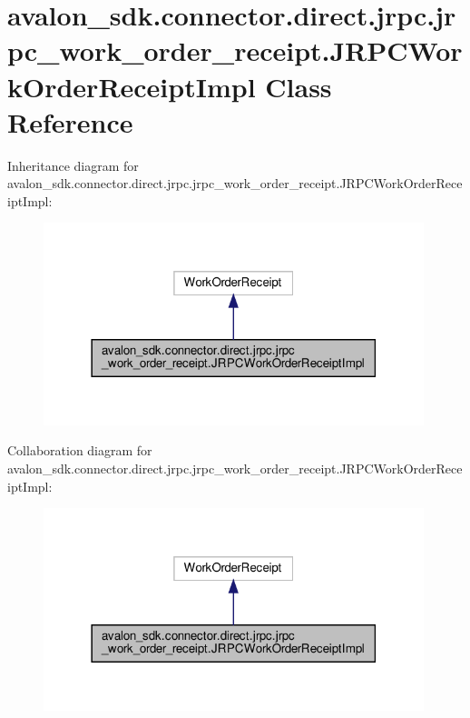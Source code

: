 \hypertarget{classavalon__sdk_1_1connector_1_1direct_1_1jrpc_1_1jrpc__work__order__receipt_1_1JRPCWorkOrderReceiptImpl}{}\section{avalon\+\_\+sdk.\+connector.\+direct.\+jrpc.\+jrpc\+\_\+work\+\_\+order\+\_\+receipt.\+J\+R\+P\+C\+Work\+Order\+Receipt\+Impl Class Reference}
\label{classavalon__sdk_1_1connector_1_1direct_1_1jrpc_1_1jrpc__work__order__receipt_1_1JRPCWorkOrderReceiptImpl}


Inheritance diagram for avalon\+\_\+sdk.\+connector.\+direct.\+jrpc.\+jrpc\+\_\+work\+\_\+order\+\_\+receipt.\+J\+R\+P\+C\+Work\+Order\+Receipt\+Impl\+:
\nopagebreak
\begin{figure}[H]
\begin{center}
\leavevmode
\includegraphics[width=314pt]{classavalon__sdk_1_1connector_1_1direct_1_1jrpc_1_1jrpc__work__order__receipt_1_1JRPCWorkOrderReceiptImpl__inherit__graph}
\end{center}
\end{figure}


Collaboration diagram for avalon\+\_\+sdk.\+connector.\+direct.\+jrpc.\+jrpc\+\_\+work\+\_\+order\+\_\+receipt.\+J\+R\+P\+C\+Work\+Order\+Receipt\+Impl\+:
\nopagebreak
\begin{figure}[H]
\begin{center}
\leavevmode
\includegraphics[width=314pt]{classavalon__sdk_1_1connector_1_1direct_1_1jrpc_1_1jrpc__work__order__receipt_1_1JRPCWorkOrderReceiptImpl__coll__graph}
\end{center}
\end{figure}
